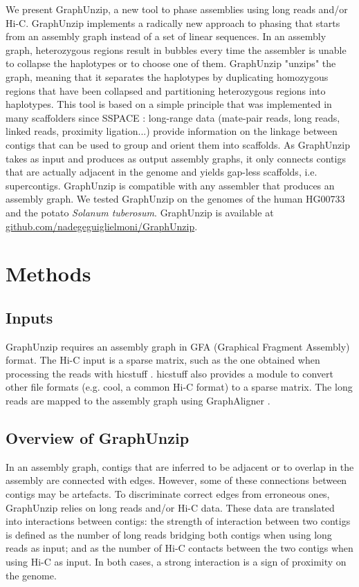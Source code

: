 We present GraphUnzip, a new tool to phase assemblies using long reads and/or Hi-C. GraphUnzip implements a radically new approach to phasing that starts from an assembly graph instead of a set of linear sequences. In an assembly graph, heterozygous regions result in bubbles every time the assembler is unable to collapse the haplotypes or to choose one of them. GraphUnzip "unzips" the graph, meaning that it separates the haplotypes by duplicating homozygous regions that have been collapsed and partitioning heterozygous regions into haplotypes. This tool is based on a simple principle that was implemented in many scaffolders since SSPACE \cite{sspace}: long-range data (mate-pair reads, long reads, linked reads, proximity ligation...) provide information on the linkage between contigs that can be used to group and orient them into scaffolds. As GraphUnzip takes as input and produces as output assembly graphs, it only connects contigs that are actually adjacent in the genome and yields gap-less scaffolds, i.e. supercontigs. GraphUnzip is compatible with any assembler that produces an assembly graph. We tested GraphUnzip on the genomes of the human HG00733 and the potato \textit{Solanum tuberosum}. GraphUnzip is available at \href{https://github.com/nadegeguiglielmoni/GraphUnzip}{github.com/nadegeguiglielmoni/GraphUnzip}. \\

\section{Methods}

\subsection{Inputs}

GraphUnzip requires an assembly graph in GFA (Graphical Fragment Assembly) format. The Hi-C input is a sparse matrix, such as the one obtained when processing the reads with hicstuff \cite{hicstuff}. hicstuff also provides a module to convert other file formats (e.g. cool, a common Hi-C format) to a sparse matrix. The long reads are mapped to the assembly graph using GraphAligner \cite{graphaligner}.

\subsection{Overview of GraphUnzip}

In an assembly graph, contigs that are inferred to be adjacent or to overlap in the assembly are connected with edges. However, some of these connections between contigs may be artefacts. To discriminate correct edges from erroneous ones, GraphUnzip relies on long reads and/or Hi-C data. These data are translated into interactions between contigs: the strength of interaction between two contigs is defined as the number of long reads bridging both contigs when using long reads as input; and as the number of Hi-C contacts between the two contigs when using Hi-C as input. In both cases, a strong interaction is a sign of proximity on the genome. \\

